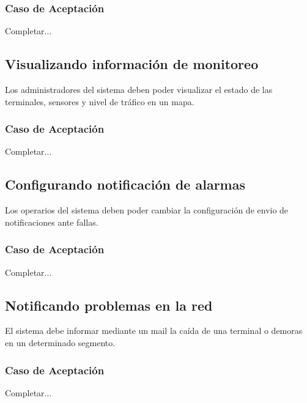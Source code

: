 \subsubsection*{Caso de Aceptación}
Completar...

\linea \subsection*{Visualizando información de monitoreo}
Los administradores del sistema deben poder visualizar el estado de las terminales, sensores y nivel de tráfico en un mapa.
\subsubsection*{Caso de Aceptación}
Completar...

\linea \subsection*{Configurando notificación de alarmas}
Los operarios del sistema deben poder cambiar la configuración de envio de notificaciones ante fallas.
\subsubsection*{Caso de Aceptación}
Completar...

\linea \subsection*{Notificando problemas en la red}
El sistema debe informar mediante un mail la caída de una terminal o demoras en un determinado segmento.
\subsubsection*{Caso de Aceptación}
Completar...

